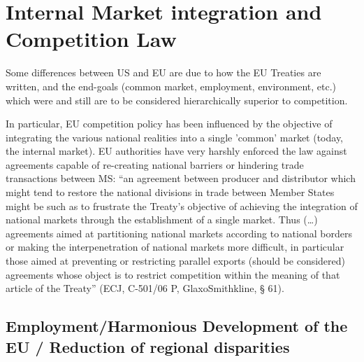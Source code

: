 
\section{Internal Market integration and Competition Law}

    Some differences between US and EU are due to how the EU Treaties are written, and the end-goals (common market, employment, environment, etc.) which were and still are to be considered hierarchically superior to competition.

    In particular, EU competition policy has been influenced by the objective of integrating the various national realities into a single 'common' market (today, the internal market). 
    EU authorities have very harshly enforced the law against agreements capable of re-creating national barriers or hindering trade transactions between MS: 
    “an agreement between producer and distributor which might tend to restore the national divisions in trade between Member States might be such as to frustrate the Treaty’s objective of achieving the integration of national markets through the establishment of a single market. Thus (…) agreements aimed at partitioning national markets according to national borders or making the interpenetration of national markets more difficult, in particular those aimed at preventing or restricting parallel exports (should be considered) agreements whose object is to restrict competition within the meaning of that article of the Treaty” (ECJ, C-501/06 P, GlaxoSmithkline, § 61).


\newpage
    \subsection{Employment/Harmonious Development of the EU / Reduction of regional disparities}


